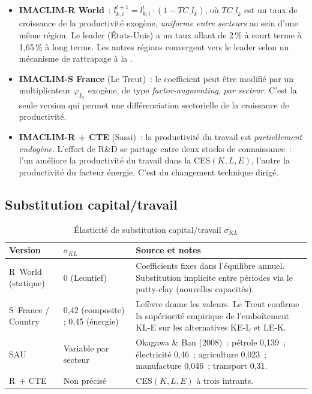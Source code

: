 \begin{itemize}
\item \textbf{IMACLIM-R World}~: $l_{k,i}^{t+1} = l_{k,i}^{t} \cdot (1 - \mathit{TC\_l}_k)$, où $\mathit{TC\_l}_k$ est un taux de croissance de la productivité exogène, \emph{uniforme entre secteurs} au sein d'une même région. Le leader (États-Unis) a un taux allant de 2\,\% à court terme à 1,65\,\% à long terme. Les autres régions convergent vers le leader selon un mécanisme de rattrapage à la \textcite{barro_technological_1997}.
\item \textbf{IMACLIM-S France} (Le Treut)~: le coefficient peut être modifié par un multiplicateur $\varphi_{L_i}$ exogène, de type \emph{factor-augmenting}, \emph{par secteur}. C'est la seule version qui permet une différenciation sectorielle de la croissance de productivité.
\item \textbf{IMACLIM-R + CTE} (Sassi)~: la productivité du travail est \emph{partiellement endogène}. L'effort de R\&D se partage entre deux stocks de connaissance~: l'un améliore la productivité du travail dans la CES$(K,L,E)$, l'autre la productivité du facteur énergie. C'est du changement technique dirigé.
\end{itemize}

\subsection{Substitution capital/travail}

\begin{table}[htbp]
\centering
\caption{Élasticité de substitution capital/travail $\sigma_{KL}$}\label{tab:imaclim-sigma}
\small
\begin{tabular}{p{3.5cm}p{2cm}p{6cm}}
\toprule
\textbf{Version} & $\sigma_{KL}$ & \textbf{Source et notes} \\
\midrule
R~World (statique) & 0 (Leontief) & Coefficients fixes dans l'équilibre annuel. Substitution implicite entre périodes via le putty-clay (nouvelles capacités). \\
\addlinespace
S~France / Country & 0,42 (composite) ; 0,45 (énergie) & Lefèvre donne les valeurs. Le Treut confirme la supériorité empirique de l'emboîtement KL-E sur les alternatives KE-L et LE-K. \\
\addlinespace
SAU & Variable par secteur & Okagawa \& Ban (2008)~: pétrole 0,139~; électricité 0,46~; agriculture 0,023~; manufacture 0,046~; transport 0,31. \\
\addlinespace
R~+ CTE & Non précisé & CES$(K,L,E)$ à trois intrants. \\
\bottomrule
\end{tabular}
\end{table}


